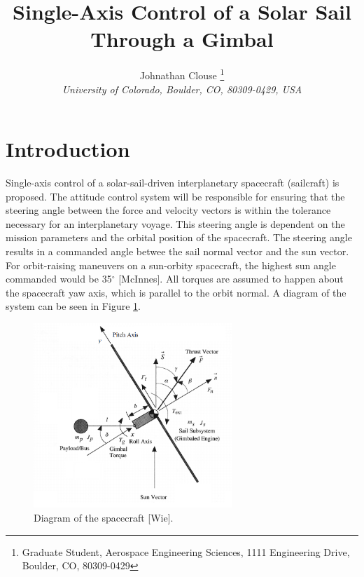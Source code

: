 \documentclass[]{aiaa-tc}%
\title{Single-Axis Control of a Solar Sail Through a Gimbal}
\author{
	Johnathan Clouse%
	\thanks{Graduate Student, Aerospace Engineering Sciences, 1111 Engineering Drive, Boulder, CO, 80309-0429}\\
	{\normalsize\itshape
		University of Colorado, Boulder, CO, 80309-0429, USA}
}
\begin{document}
	

	
	\maketitle
	
	\begin{abstract}
		\noindent 
		
	\end{abstract}
	
	\newpage
	
	\tableofcontents
	
	\newpage

	\section{Introduction}
Single-axis control of a solar-sail-driven interplanetary spacecraft (sailcraft) is proposed.  The attitude control system will be responsible for ensuring that the steering angle between the force and velocity vectors is within the tolerance necessary for an interplanetary voyage.  This steering angle is dependent on the mission parameters and the orbital position of the spacecraft. The steering angle results in a commanded angle betwee the sail normal vector and the sun vector. For orbit-raising maneuvers on a sun-orbity spacecraft, the highest sun angle commanded would be 35$^{\circ}$ [McInnes]. All torques are assumed to happen about the spacecraft yaw axis, which is parallel to the orbit normal. A diagram of the system can be seen in Figure \ref{fig:Diagram}.
	
	\begin{figure}[H]
		\centering
			\includegraphics[width = 7.5cm]{schematic.png}
		\caption{Diagram of the spacecraft [Wie]. }
		\label{fig:Diagram}
	\end{figure}	
	
	\vspace{5 mm}
	
\end{document}
